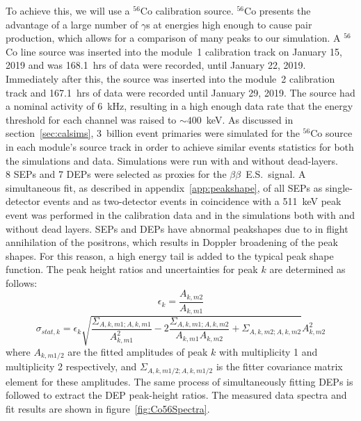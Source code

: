 \documentclass[notitlepage,rmp,aps,10pt]{revtex4-1}
\newcommand{\bb}{${\beta \beta}$}
\newcommand{\bbes}{\bb~E.S.}
\newcommand{\iso}[2]{$^{#1}$#2}
\newcommand{\Co}[1]{\iso{#1}{Co}}
\begin{document}
To achieve this, we will use a \Co{56} calibration source.
\Co{56} presents the advantage of a large number of $\gamma$s at energies high enough to cause pair production, which allows for a comparison of many peaks to our simulation.
A \Co{56} line source was inserted into the module~1 calibration track on January 15, 2019 and was 168.1~hrs of data were recorded, until January 22, 2019.
Immediately after this, the source was inserted into the module~2 calibration track and 167.1~hrs of data were recorded until January 29, 2019.
The source had a nominal activity of 6~kHz, resulting in a high enough data rate that the energy threshold for each channel was raised to $\sim400$~keV.
As discussed in section~\ref{sec:calsims}, 3~billion event primaries were simulated for the \Co{56} source in each module's source track in order to achieve similar events statistics for both the simulations and data.
Simulations were run with and without dead-layers.
\\
8 SEPs and 7 DEPs were selected as proxies for the \bbes\ signal.
A simultaneous fit, as described in appendix~\ref{app:peakshape}, of all SEPs as single-detector events and as two-detector events in coincidence with a 511~keV peak event was performed in the calibration data and in the simulations both with and without dead layers.
SEPs and DEPs have abnormal peakshapes due to in flight annihilation of the positrons, which results in Doppler broadening of the peak shapes.
For this reason, a high energy tail is added to the typical peak shape function.
The peak height ratios and uncertainties for peak $k$ are determined as follows:
\begin{equation}
  \epsilon_k=\frac{A_{k,m2}}{A_{k,m1}}
\end{equation}
\begin{equation}
  \sigma_{stat, k}=\epsilon_k \sqrt{\frac{\Sigma_{A,k,m1;A,k,m1}}{A_{k,m1}^2}-2\frac{\Sigma_{A,k,m1;A,k,m2}}{A_{k,m1}A_{k,m2}}+\Sigma_{A,k,m2;A,k,m2}}{A_{k,m2}^2}
\end{equation}
where $A_{k,m1/2}$ are the fitted amplitudes of peak $k$ with multiplicity 1 and multiplicity 2 respectively, and $\Sigma_{A,k,m1/2;A,k,m1/2}$ is the fitter covariance matrix element for these amplitudes.
The same process of simultaneously fitting DEPs is followed to extract the DEP peak-height ratios.
The measured data spectra and fit results are shown in figure~\ref{fig:Co56Spectra}.
\\
\end{document}
